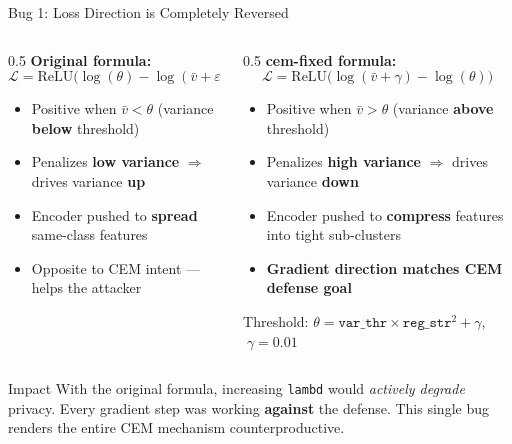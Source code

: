 \documentclass[aspectratio=169, 10pt]{beamer}
\newcommand{\fix}[1]{\textcolor{goodgreen}{\textbf{#1}}}
\newcommand{\bad}[1]{\textcolor{bugred}{#1}}
\begin{document}
\begin{frame}{Bug 1: Loss Direction is Completely Reversed}

\begin{columns}[T]
\begin{column}{0.5\textwidth}
\textbf{\bad{Original formula:}}
\[ \mathcal{L} = \text{ReLU}\!\Big(\log(\theta) - \log(\bar{v} + \varepsilon)\Big) \]
\vspace{-0.1cm}
\begin{itemize}\small
    \item Positive when $\bar{v} < \theta$ (variance \textbf{below} threshold)
    \item Penalizes \textbf{low variance} $\Rightarrow$ drives variance \textbf{up}
    \item Encoder pushed to \textbf{spread} same-class features
    \item \bad{Opposite to CEM intent --- helps the attacker}
\end{itemize}
\end{column}
\begin{column}{0.5\textwidth}
\textbf{\fix{cem-fixed formula:}}
\[ \mathcal{L} = \text{ReLU}\!\Big(\log(\bar{v} + \gamma) - \log(\theta)\Big) \]
\vspace{-0.1cm}
\begin{itemize}\small
    \item Positive when $\bar{v} > \theta$ (variance \textbf{above} threshold)
    \item Penalizes \textbf{high variance} $\Rightarrow$ drives variance \textbf{down}
    \item Encoder pushed to \textbf{compress} features into tight sub-clusters
    \item \fix{Gradient direction matches CEM defense goal}
\end{itemize}
\vspace{0.1cm}
{\small Threshold: $\theta = \texttt{var\_thr} \times \texttt{reg\_str}^2 + \gamma$, $\;\gamma{=}0.01$}
\end{column}
\end{columns}

\vspace{0.1cm}
\begin{alertblock}{Impact}
\small With the original formula, increasing \texttt{lambd} would \textit{actively degrade} privacy. Every gradient step was working \textbf{against} the defense. This single bug renders the entire CEM mechanism counterproductive.
\end{alertblock}

\end{frame}
\end{document}
